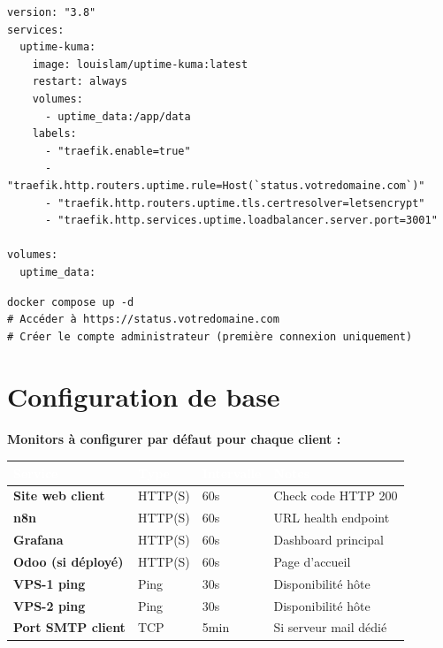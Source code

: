 \documentclass[11pt, a4paper]{article}
\begin{document}
\begin{lstlisting}[style=yamlstyle, caption={docker-compose.yml — Uptime Kuma}]
version: "3.8"
services:
  uptime-kuma:
    image: louislam/uptime-kuma:latest
    restart: always
    volumes:
      - uptime_data:/app/data
    labels:
      - "traefik.enable=true"
      - "traefik.http.routers.uptime.rule=Host(`status.votredomaine.com`)"
      - "traefik.http.routers.uptime.tls.certresolver=letsencrypt"
      - "traefik.http.services.uptime.loadbalancer.server.port=3001"

volumes:
  uptime_data:
\end{lstlisting}

\begin{lstlisting}[style=terminal, caption={Démarrage et premier accès}]
docker compose up -d
# Accéder à https://status.votredomaine.com
# Créer le compte administrateur (première connexion uniquement)
\end{lstlisting}

\section{Configuration de base}

\textbf{Monitors à configurer par défaut pour chaque client :}

\begin{center}
\renewcommand{\arraystretch}{1.4}
\begin{tabularx}{\linewidth}{>{\bfseries}p{3cm} p{2cm} p{2.5cm} X}
\toprule
\rowcolor{tabheader}
\textcolor{white}{\textbf{Service}} & \textcolor{white}{\textbf{Type}} & \textcolor{white}{\textbf{Intervalle}} & \textcolor{white}{\textbf{Notes}} \\
\midrule
Site web client & HTTP(S) & 60s & Check code HTTP 200 \\
\rowcolor{rowgray}
n8n & HTTP(S) & 60s & URL health endpoint \\
Grafana & HTTP(S) & 60s & Dashboard principal \\
\rowcolor{rowgray}
Odoo (si déployé) & HTTP(S) & 60s & Page d'accueil \\
VPS-1 ping & Ping & 30s & Disponibilité hôte \\
\rowcolor{rowgray}
VPS-2 ping & Ping & 30s & Disponibilité hôte \\
Port SMTP client & TCP & 5min & Si serveur mail dédié \\
\bottomrule
\end{tabularx}
\end{center}
\end{document}
